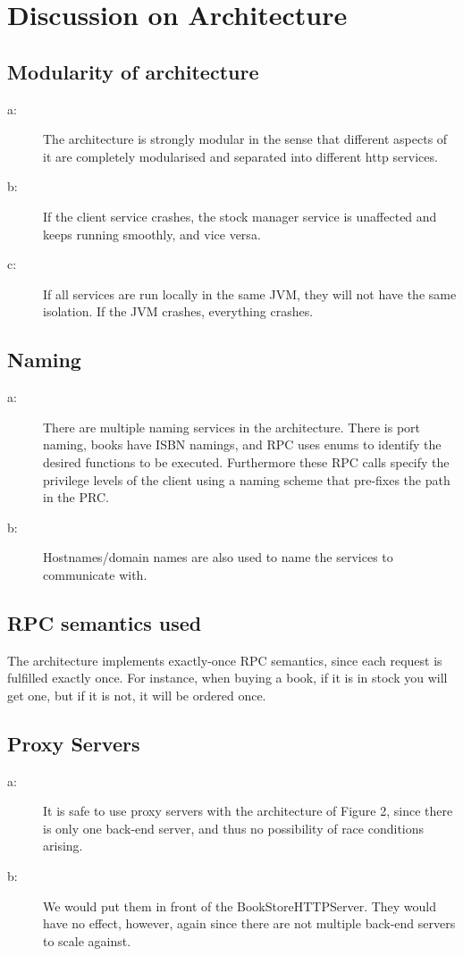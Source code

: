 \chapter{Discussion on Architecture}

\section{Modularity of architecture}
\begin{description}
\item[a:] The architecture is strongly modular in the sense that different aspects of it are completely modularised and separated into different http services.
\item[b:] If the client service crashes, the stock manager service is unaffected and keeps running smoothly, and vice versa.
\item[c:] If all services are run locally in the same JVM, they will not have the same isolation. If the JVM crashes, everything crashes.
\end{description}

\section{Naming}
\begin{description}
\item[a:] There are multiple naming services in the architecture. There is port naming, books have ISBN namings, and RPC uses enums to identify the desired functions to be executed. Furthermore these RPC calls specify the privilege levels of the client using a naming scheme that pre-fixes the path in the PRC.
\item[b:] Hostnames/domain names are also used to name the services to communicate with.
\end{description}

\section{RPC semantics used}
The architecture implements exactly-once RPC semantics, since each request is fulfilled exactly once. For instance, when buying a book, if it is in stock you will get one, but if it is not, it will be ordered once.

\section{Proxy Servers}
\begin{description}
\item[a:] It is safe to use proxy servers with the architecture of Figure 2, since there is only one back-end server, and thus no possibility of race conditions arising.
\item[b:] We would put them in front of the BookStoreHTTPServer. They would have no effect, however, again since there are not multiple back-end servers to scale against.
\end{description}

